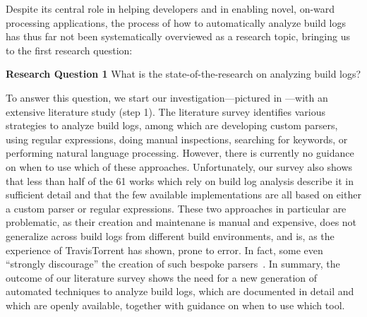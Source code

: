 Despite its central role in helping developers and in enabling
novel, on-ward processing applications,
the process of how to
automatically analyze build logs has thus far not been systematically
overviewed as a research topic, bringing us to the first
research question:
\begin{simplebox}[minipage boxed title*=-5cm]{\textbf{Research Question
1}}
What is the state-of-the-research on analyzing build logs?
\end{simplebox}

To answer this question, we start our investigation---pictured in
---with an
extensive literature study (step 1).
The literature
survey identifies various strategies to
analyze build logs, among which are developing
custom parsers, using regular expressions, doing manual inspections,
searching for keywords, or performing natural language processing.
However, there is currently no guidance on when to use which of these
approaches.
Unfortunately, our survey also shows that
less than half of the 61 works which rely on build log analysis
describe it in sufficient detail and that
the few available implementations are all based on either a custom parser
or regular expressions.
These two approaches in particular are problematic, as their creation
and maintenane is manual and expensive, does not generalize across build
logs from different build environments, and is, as the experience of
TravisTorrent has shown, prone to error.
In fact, some even ``strongly discourage'' the creation of such
bespoke parsers~\cite{urli2018design}.
In summary, the outcome of our literature survey shows the need for a new
generation of automated techniques to analyze build logs, which are
documented in detail and which are openly available, together with
guidance on when to use which tool.


